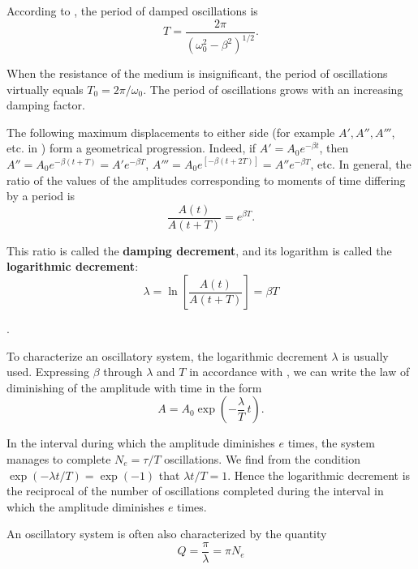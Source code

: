 According to , the period of damped oscillations is
\begin{equation}\label{eq:7_103}
	T = \frac{2\pi}{\left(\omega_0^2 - \beta^2\right)^{1/2}}.
\end{equation}

\noindent
When the resistance of the medium is insignificant, the period of oscillations virtually equals $T_0=2\pi/\omega_0$. The period of oscillations grows with an increasing damping factor.

The following maximum displacements to either side (for example $A', A'', A'''$, etc. in ) form a geometrical progression. Indeed, if $A'=A_0e^{-\beta t}$, then $A''=A_0e^{-\beta(t+T)}=A'e^{-\beta T}$, $A'''=A_0e^{[-\beta(t+2T)]}=A''e^{-\beta T}$, etc. In general, the ratio of the values of the amplitudes corresponding to moments of time differing by a period is
\begin{equation*}
	\frac{A(t)}{A(t+T)} = e^{\beta T}.
\end{equation*}

\noindent
This ratio is called the \textbf{damping decrement}, and its logarithm is called the \textbf{logarithmic decrement}:
\begin{equation}\label{eq:7_104}
	\lambda = \ln\left[\frac{A(t)}{A(t+T)}\right] = \beta T
\end{equation}

.

To characterize an oscillatory system, the logarithmic decrement $\lambda$ is usually used. Expressing $\beta$ through $\lambda$ and $T$ in accordance with , we can write the law of diminishing of the amplitude with time in the form
\begin{equation}\label{eq:7_105}
	A = A_0\exp\left(-\frac{\lambda}{T}\,t\right).
\end{equation}

\noindent
In the interval during which the amplitude diminishes $e$ times, the system manages to complete $N_e=\tau/T$ oscillations. We find from the condition $\exp(-\lambda t/T)=\exp(-1)$ that $\lambda t/T=1$. Hence the logarithmic decrement is the reciprocal of the number of oscillations completed during the interval in which the amplitude diminishes $e$ times.

An oscillatory system is often also characterized by the quantity
\begin{equation}\label{eq:7_106}
	Q = \frac{\pi}{\lambda} = \pi N_e
\end{equation}

